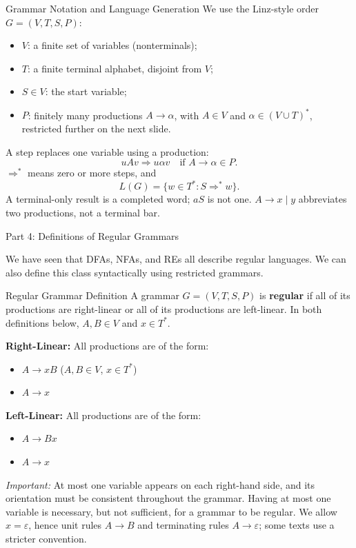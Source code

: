 \documentclass[10pt]{beamer}
\begin{document}
\begin{frame}{Grammar Notation and Language Generation}
  \small
  We use the Linz-style order $G=(V,T,S,P)$:
  \begin{itemize}
    \item $V$: a finite set of variables (nonterminals);
    \item $T$: a finite terminal alphabet, disjoint from $V$;
    \item $S\in V$: the start variable;
    \item $P$: finitely many productions $A\to\alpha$, with $A\in V$ and
      $\alpha\in(V\cup T)^*$, restricted further on the next slide.
  \end{itemize}
  \pause
  A step replaces one variable using a production:
  \[
    uAv\Rightarrow u\alpha v\quad\text{if }A\to\alpha\in P.
  \]
  $\Rightarrow^*$ means zero or more steps, and
  \[
    L(G)=\{w\in T^*:S\Rightarrow^*w\}.
  \]
  A terminal-only result is a completed word; $aS$ is not one.
  $A\to x\mid y$ abbreviates two productions, not a terminal bar.
\end{frame}

\begin{frame}{Part 4: Definitions of Regular Grammars}
  \small    

  We have seen that DFAs, NFAs, and REs all describe regular languages. We can
  also define this class syntactically using restricted grammars.
  \pause

  \begin{block}{Regular Grammar Definition}
    A grammar $G = (V, T, S, P)$ is \textbf{regular} if all of its productions
    are right-linear or all of its productions are left-linear.
    In both definitions below, $A,B\in V$ and $x\in T^*$.

    \textbf{Right-Linear:} All productions are of the form:
    \begin{itemize}
      \item $A \rightarrow xB$ \quad ($A, B \in V$, $x \in T^*$)
      \item $A \rightarrow x$
    \end{itemize}

    \textbf{Left-Linear:} All productions are of the form:
    \begin{itemize}
      \item $A \rightarrow Bx$
      \item $A \rightarrow x$
    \end{itemize}
  \end{block}
  \pause
  \textit{Important:} At most one variable appears on each right-hand side,
  and its orientation must be consistent throughout the grammar. Having at
  most one variable is necessary, but not sufficient, for a grammar to be
  regular. We allow $x=\varepsilon$, hence unit rules $A\to B$ and
  terminating rules $A\to\varepsilon$; some texts use a stricter convention.
\end{frame}
\end{document}
